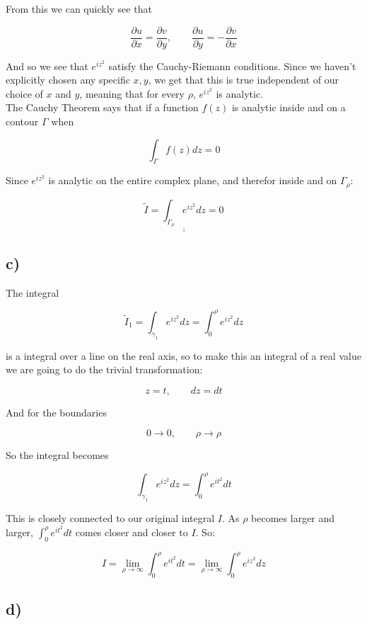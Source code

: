 \documentclass[a4paper,norsk, 10pt]{article}
\begin{document}
From this we can quickly see that

$$
\frac{\partial u}{\partial x} = \frac{\partial v}{\partial y}, \qquad \frac{\partial u}{\partial y} = -\frac{\partial v}{\partial x}
$$

And so we see that $e^{iz^2}$ satisfy the Cauchy-Riemann conditions. Since we haven't explicitly chosen any specific $x,y$, we get that this is true independent of our choice of $x$ and $y$, meaning that for every $\rho$, $e^{iz^2}$ is analytic.\\

 The Cauchy Theorem says that if a function $f(z)$ is analytic inside and on a contour $\Gamma$ when

$$
\int_{\Gamma} f(z) dz = 0
$$

Since $e^{iz^2}$ is analytic on the entire complex plane, and therefor inside and on $\Gamma_{\rho}$:

$$
\underline{\underline{\tilde{I} = \int_{\Gamma_{\rho}} e^{iz^2}dz = 0}}
$$

\subsection*{c)}

The integral

$$
\tilde{I}_1 = \int_{\gamma_1} e^{iz^2} dz = \int_0^{\rho} e^{iz^2} dz
$$

is a integral over a line on the real axis, so to make this an integral of a real value we are going to do the trivial transformation:

$$
z = t, \qquad dz = dt
$$

And for the boundaries

$$
0 \rightarrow 0, \qquad \rho \rightarrow \rho
$$

So the integral becomes

$$
\int_{\gamma_1} e^{iz^2} dz = \int_0^{\rho} e^{it^2}dt
$$

This is closely connected to our original integral $I$. As $\rho$ becomes larger and larger, $\int_0^{\rho} e^{it^2}dt$ comes closer and closer to $I$. So:

\begin{equation}
I = \lim_{\rho \rightarrow \infty} \int_0^{\rho} e^{it^2}dt = \lim_{\rho \rightarrow \infty} \int_0^{\rho} e^{iz^2}dz
\label{eq:I1}
\end{equation}


\newpage
\subsection*{d)}
\end{document}
